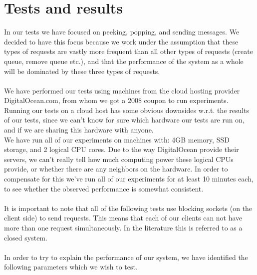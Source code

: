 \documentclass{article}
\begin{document}
    \section{Tests and results}
        \label{sec:tests_and_results}
        In our tests we have focused on peeking, popping, and sending messages. We decided to have this focus because we work under the assumption that these types of requests are vastly more frequent than all other types of requests (create queue, remove queue etc.), and that the performance of the system as a whole will be dominated by these three types of requests.\\
        \\
        We have performed our tests using machines from the cloud hosting provider DigitalOcean.com, from whom we got a 200\$ coupon to run experiments. Running our tests on a cloud host has some obvious downsides w.r.t. the results of our tests, since we can't know for sure which hardware our tests are run on, and if we are sharing this hardware with anyone.\\
        We have run all of our experiments on machines with: 4GB memory, SSD storage, and 2 logical CPU cores. Due to the way DigitalOcean provide their servers, we can't really tell how much computing power these logical CPUs provide, or whether there are any neighbors on the hardware. In order to compensate for this we've run all of our experiments for at least 10 minutes each, to see whether the observed performance is somewhat consistent.\\
        \\
        It is important to note that all of the following tests use blocking sockets (on the client side) to send requests. This means that each of our clients can not have more than one request simultaneously. In the literature this is referred to as a closed system.\\
        \\
        In order to try to explain the performance of our system, we have identified the following parameters which we wish to test.
\end{document}
